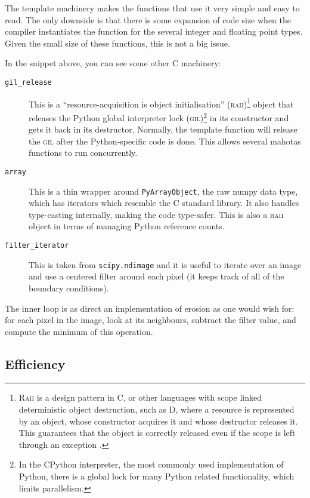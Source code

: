 \documentclass{article}
\newcommand*{\cpp}{{C\nolinebreak[4]\hspace{-.05em}\raisebox{.4ex}{\tiny\textbf{++}}}}
\let\code\texttt
\begin{document}
The template machinery makes the functions that use it very simple and easy to
read. The only downside is that there is some expansion of code size when the
compiler instantiates the function for the several integer and floating point
types. Given the small size of these functions, this is not a big issue.

In the snippet above, you can see some other \cpp{} machinery:

\begin{description}
\item[\code{gil\_release}] This is a ``resource-acquisition is object
initialisation'' (\textsc{raii})\footnote{\textsc{Raii} is a design pattern in
\cpp{}, or other languages with scope linked deterministic object destruction,
such as D, where a resource is represented by an object, whose constructor
acquires it and whose destructor releases it. This guarantees that the object
is correctly released even if the scope is left through an exception
\citep{Stroustrup1994}.} object that releases the Python global interpreter lock
(\textsc{gil})\footnote{In the CPython interpreter, the most commonly used
implementation of Python, there is a global lock for many Python related
functionality, which limits parallelism.} in its constructor and gets it back
in its destructor. Normally, the template function will release the
\textsc{gil} after the Python-specific code is done. This allows several
mahotas functions to run concurrently.
\item[\code{array}] This is a thin wrapper around \code{PyArrayObject}, the raw
numpy data type, which has iterators which resemble the \cpp{} standard
library. It also handles type-casting internally, making the code type-safer.
This is also a \textsc{raii} object in terms of managing Python reference
counts.
\item[\code{filter\_iterator}] This is taken from \code{scipy.ndimage} and it
is useful to iterate over an image and use a centered filter around each pixel
(it keeps track of all of the boundary conditions).
\end{description}

The inner loop is as direct an implementation of erosion as one would wish for:
for each pixel in the image, look at its neighbours, subtract the filter value,
and compute the minimum of this operation.

\subsection{Efficiency}
\end{document}
